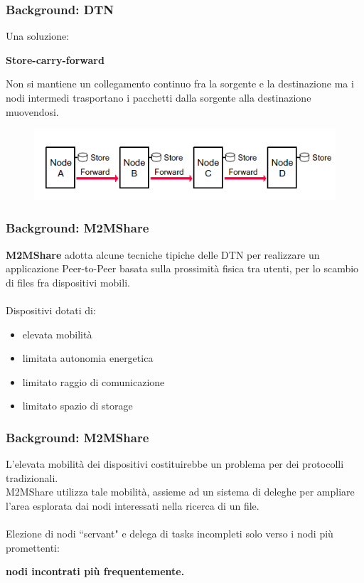 \documentclass{beamer}
\begin{document}
\begin{frame}
\frametitle{Background: DTN}
Una soluzione:
\ \\
\begin{center}
\textbf{Store-carry-forward}\\
\end{center}

Non si mantiene un collegamento continuo fra la sorgente e la destinazione ma i nodi intermedi trasportano i pacchetti dalla sorgente alla destinazione muovendosi.

\begin{center}
\begin{figure}[ht]
\includegraphics[scale=0.4]{store-and-forward.png}
\end{figure}
\end{center}
\end{frame}




\begin{frame}
\frametitle{Background: M2MShare}
\label{M2MShare}
\textbf{M2MShare} adotta alcune tecniche tipiche delle DTN per realizzare un applicazione Peer-to-Peer basata sulla prossimità fisica tra utenti, per lo scambio di files fra dispositivi mobili.
\ \\
\ \\
\pause 
Dispositivi dotati di:
\begin{itemize}
\item elevata mobilità
\item limitata autonomia energetica
\item limitato raggio di comunicazione
\item limitato spazio di storage
\end{itemize}
\end{frame}

\begin{frame}
\frametitle{Background: M2MShare}
L'elevata mobilità dei dispositivi costituirebbe un problema per dei protocolli tradizionali.\\
M2MShare utilizza tale mobilità, assieme ad un sistema di deleghe per ampliare l'area esplorata dai nodi interessati nella ricerca di un file.
\ \\
\ \\
\pause
Elezione di nodi ``servant" e delega di tasks incompleti solo verso i nodi più promettenti: \\
\begin{center}
\textbf{nodi incontrati più frequentemente.}
\end{center}
\end{frame}
\end{document}

